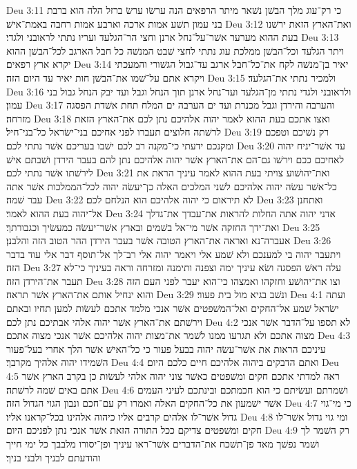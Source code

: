 Deu 3:11  כי רק־עוג מלך הבשׁן נשׁאר מיתר הרפאים הנה ערשׂו ערשׂ ברזל הלה הוא ברבת בני עמון תשׁע אמות ארכה וארבע אמות רחבה באמת־אישׁ׃
Deu 3:12  ואת־הארץ הזאת ירשׁנו בעת ההוא מערער אשׁר־על־נחל ארנן וחצי הר־הגלעד ועריו נתתי לראובני ולגדי׃
Deu 3:13  ויתר הגלעד וכל־הבשׁן ממלכת עוג נתתי לחצי שׁבט המנשׁה כל חבל הארגב לכל־הבשׁן ההוא יקרא ארץ רפאים׃
Deu 3:14  יאיר בן־מנשׁה לקח את־כל־חבל ארגב עד־גבול הגשׁורי והמעכתי ויקרא אתם על־שׁמו את־הבשׁן חות יאיר עד היום הזה׃
Deu 3:15  ולמכיר נתתי את־הגלעד׃
Deu 3:16  ולראובני ולגדי נתתי מן־הגלעד ועד־נחל ארנן תוך הנחל וגבל ועד יבק הנחל גבול בני עמון׃
Deu 3:17  והערבה והירדן וגבל מכנרת ועד ים הערבה ים המלח תחת אשׁדת הפסגה מזרחה׃
Deu 3:18  ואצו אתכם בעת ההוא לאמר יהוה אלהיכם נתן לכם את־הארץ הזאת לרשׁתה חלוצים תעברו לפני אחיכם בני־ישׂראל כל־בני־חיל׃
Deu 3:19  רק נשׁיכם וטפכם ומקנכם ידעתי כי־מקנה רב לכם ישׁבו בעריכם אשׁר נתתי לכם׃
Deu 3:20  עד אשׁר־יניח יהוה לאחיכם ככם וירשׁו גם־הם את־הארץ אשׁר יהוה אלהיכם נתן להם בעבר הירדן ושׁבתם אישׁ לירשׁתו אשׁר נתתי לכם׃
Deu 3:21  ואת־יהושׁוע צויתי בעת ההוא לאמר עיניך הראת את כל־אשׁר עשׂה יהוה אלהיכם לשׁני המלכים האלה כן־יעשׂה יהוה לכל־הממלכות אשׁר אתה עבר שׁמה׃
Deu 3:22  לא תיראום כי יהוה אלהיכם הוא הנלחם לכם׃
Deu 3:23  ואתחנן אל־יהוה בעת ההוא לאמר׃
Deu 3:24  אדני יהוה אתה החלות להראות את־עבדך את־גדלך ואת־ידך החזקה אשׁר מי־אל בשׁמים ובארץ אשׁר־יעשׂה כמעשׂיך וכגבורתך׃
Deu 3:25  אעברה־נא ואראה את־הארץ הטובה אשׁר בעבר הירדן ההר הטוב הזה והלבנן׃
Deu 3:26  ויתעבר יהוה בי למענכם ולא שׁמע אלי ויאמר יהוה אלי רב־לך אל־תוסף דבר אלי עוד בדבר הזה׃
Deu 3:27  עלה ראשׁ הפסגה ושׂא עיניך ימה וצפנה ותימנה ומזרחה וראה בעיניך כי־לא תעבר את־הירדן הזה׃
Deu 3:28  וצו את־יהושׁע וחזקהו ואמצהו כי־הוא יעבר לפני העם הזה והוא ינחיל אותם את־הארץ אשׁר תראה׃
Deu 3:29  ונשׁב בגיא מול בית פעור׃
Deu 4:1  ועתה ישׂראל שׁמע אל־החקים ואל־המשׁפטים אשׁר אנכי מלמד אתכם לעשׂות למען תחיו ובאתם וירשׁתם את־הארץ אשׁר יהוה אלהי אבתיכם נתן לכם׃
Deu 4:2  לא תספו על־הדבר אשׁר אנכי מצוה אתכם ולא תגרעו ממנו לשׁמר את־מצות יהוה אלהיכם אשׁר אנכי מצוה אתכם׃
Deu 4:3  עיניכם הראות את אשׁר־עשׂה יהוה בבעל פעור כי כל־האישׁ אשׁר הלך אחרי בעל־פעור השׁמידו יהוה אלהיך מקרבך׃
Deu 4:4  ואתם הדבקים ביהוה אלהיכם חיים כלכם היום׃
Deu 4:5  ראה למדתי אתכם חקים ומשׁפטים כאשׁר צוני יהוה אלהי לעשׂות כן בקרב הארץ אשׁר אתם באים שׁמה לרשׁתה׃
Deu 4:6  ושׁמרתם ועשׂיתם כי הוא חכמתכם ובינתכם לעיני העמים אשׁר ישׁמעון את כל־החקים האלה ואמרו רק עם־חכם ונבון הגוי הגדול הזה׃
Deu 4:7  כי מי־גוי גדול אשׁר־לו אלהים קרבים אליו כיהוה אלהינו בכל־קראנו אליו׃
Deu 4:8  ומי גוי גדול אשׁר־לו חקים ומשׁפטים צדיקם ככל התורה הזאת אשׁר אנכי נתן לפניכם היום׃
Deu 4:9  רק השׁמר לך ושׁמר נפשׁך מאד פן־תשׁכח את־הדברים אשׁר־ראו עיניך ופן־יסורו מלבבך כל ימי חייך והודעתם לבניך ולבני בניך׃
